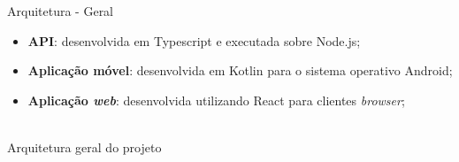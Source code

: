 \begin{frame}{Arquitetura - Geral}

\vspace*{-3em}

\begin{itemize}
	\item \textbf{API}: desenvolvida em Typescript e executada sobre Node.js;
	\item \textbf{Aplicação móvel}: desenvolvida em Kotlin para o sistema operativo Android;
	\item \textbf{Aplicação \textit{web}}: desenvolvida utilizando React para clientes \textit{browser};
\end{itemize}

\centering
{}\\

Arquitetura geral do projeto

\end{frame}





